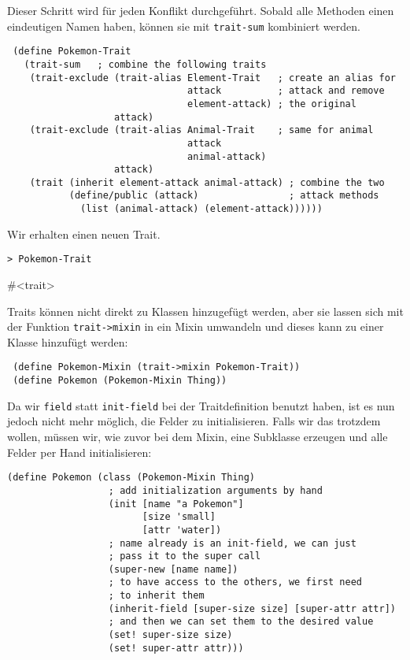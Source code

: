 Dieser Schritt wird für jeden Konflikt durchgeführt. Sobald alle Methoden einen eindeutigen Namen haben, können sie mit \texttt{trait-sum} kombiniert werden.

\begin{lstlisting}
 (define Pokemon-Trait
   (trait-sum   ; combine the following traits
    (trait-exclude (trait-alias Element-Trait   ; create an alias for
                                attack          ; attack and remove
                                element-attack) ; the original
                   attack)
    (trait-exclude (trait-alias Animal-Trait    ; same for animal
                                attack         
                                animal-attack)
                   attack)
    (trait (inherit element-attack animal-attack) ; combine the two
           (define/public (attack)                ; attack methods
             (list (animal-attack) (element-attack))))))
\end{lstlisting}

Wir erhalten einen neuen Trait. 

\begin{lstlisting}
> Pokemon-Trait
\end{lstlisting}
{\routput \#<trait>}

Traits können nicht direkt zu Klassen hinzugefügt werden, aber sie lassen sich mit der Funktion \texttt{trait->mixin} in ein Mixin umwandeln und dieses kann zu einer Klasse hinzufügt werden:

\begin{lstlisting}
 (define Pokemon-Mixin (trait->mixin Pokemon-Trait))
 (define Pokemon (Pokemon-Mixin Thing))
\end{lstlisting}

Da wir \texttt{field} statt \texttt{init-field} bei der Traitdefinition benutzt haben, ist es nun jedoch nicht mehr möglich, die Felder zu initialisieren. Falls wir das trotzdem wollen, müssen wir, wie zuvor bei dem Mixin, eine Subklasse erzeugen und alle Felder per Hand initialisieren:

\begin{lstlisting}
(define Pokemon (class (Pokemon-Mixin Thing)
                  ; add initialization arguments by hand
                  (init [name "a Pokemon"]
                        [size 'small]
                        [attr 'water])
                  ; name already is an init-field, we can just
                  ; pass it to the super call
                  (super-new [name name])
                  ; to have access to the others, we first need
                  ; to inherit them
                  (inherit-field [super-size size] [super-attr attr])
                  ; and then we can set them to the desired value
                  (set! super-size size)
                  (set! super-attr attr)))
\end{lstlisting}

